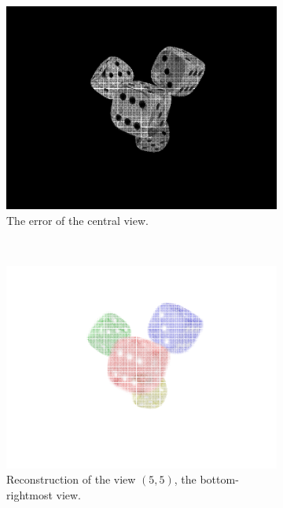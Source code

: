 \documentclass[11pt,a4paper,titlepage]{article}
\begin{document}
\begin{figure}[h]
\begin{subfigure}[t]{0.4\textwidth}
		\includegraphics[width=\textwidth]{results/dice_perspective_rec_3Layers_r=0/central_view_error.png}
		\caption{The error of the central view.}
	\end{subfigure}%
	\\
	\begin{subfigure}[t]{0.4\textwidth}
		\includegraphics[width=\textwidth]{results/dice_perspective_rec_3Layers_r=0/custom_view_reconstruction5-5.png}
		\caption{Reconstruction of the view $\left( 5, 5 \right)$, the bottom-rightmost view.}
	\end{subfigure}%
	~
	\begin{subfigure}[t]{0.4\textwidth}

\end{subfigure}
\end{figure}
\end{document}
